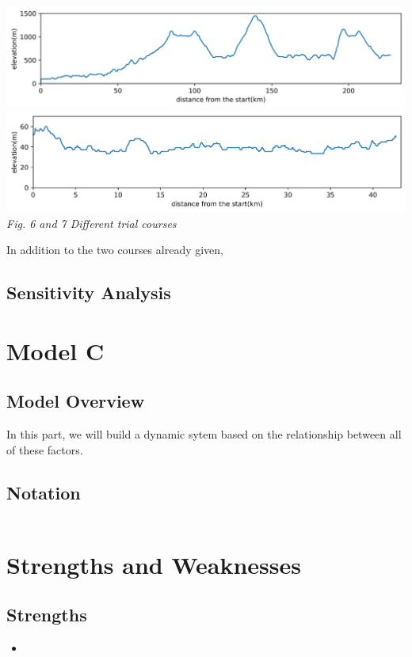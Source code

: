\documentclass{article}
\begin{document}
		\begin{center}
			\includegraphics[width=15cm]{6.png}\\
			\includegraphics[width=15cm]{7.png}\\
			\small \textit{Fig. 6 and 7  Different trial courses}
		\end{center}
		In addition to the two courses already given,
		\subsection{Sensitivity Analysis}
	\section{Model C}
		\subsection{Model Overview}
			In this part, we will build a dynamic sytem based on the relationship between all of these factors.

		\subsection{Notation}
			\begin{tabular}{|l|l|l|}
				\hline
			\end{tabular}
	\section{Strengths and Weaknesses}
		\subsection*{Strengths}
			\begin{itemize}
				\item
			\end{itemize}
\end{document}
